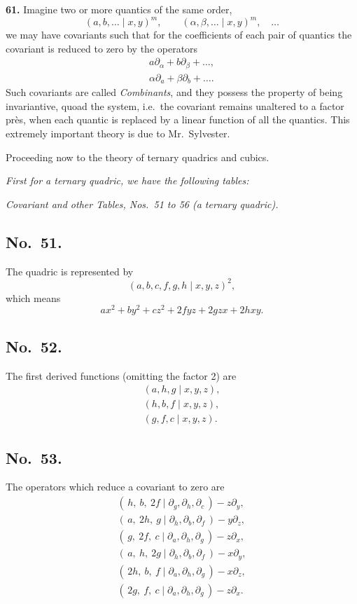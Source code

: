 \documentclass[11pt]{article}
\begin{document}
\medskip

\noindent\textbf{61.} Imagine two or more quantics of the same order,
\[
(a, b, \ldots \mid x, y)^m,\qquad (\alpha, \beta, \ldots \mid x, y)^m, \quad \ldots
\]
we may have covariants such that for the coefficients of each pair of quantics the covariant is reduced to zero by the operators
\begin{align*}
a \partial_\alpha + b \partial_\beta + \ldots, \\
\alpha \partial_a + \beta \partial_b + \ldots.
\end{align*}
Such covariants are called \textit{Combinants}, and they possess the property of being invariantive, quoad the system, i.e.\ the covariant remains unaltered to a factor pr\`es, when each quantic is replaced by a linear function of all the quantics. This extremely important theory is due to Mr.\ Sylvester.

\medskip

Proceeding now to the theory of ternary quadrics and cubics.

\bigskip

\noindent\textit{First for a ternary quadric, we have the following tables:}

\medskip

\noindent\textit{Covariant and other Tables, Nos.\ 51 to 56 (a ternary quadric).}

\subsection*{No.\ 51.}
The quadric is represented by
\[
(a, b, c, f, g, h \mid x, y, z)^2,
\]
which means
\[
ax^2 + by^2 + cz^2 + 2fyz + 2gzx + 2hxy.
\]

\subsection*{No.\ 52.}
The first derived functions (omitting the factor 2) are
\begin{align*}
(a, h, g \mid x, y, z), \\
(h, b, f \mid x, y, z), \\
(g, f, c \mid x, y, z).
\end{align*}

\subsection*{No.\ 53.}
The operators which reduce a covariant to zero are
\begin{align*}
(\,h,\ b,\ 2f \mid \partial_g, \partial_h, \partial_c\,) - z\partial_y, \\
(\,a,\ 2h,\ g \mid \partial_h, \partial_b, \partial_f\,) - y\partial_z, \\
(\,g,\ 2f,\ c \mid \partial_a, \partial_h, \partial_g\,) - z\partial_x, \\
(\,a,\ h,\ 2g \mid \partial_h, \partial_b, \partial_f\,) - x\partial_y, \\
(\,2h,\ b,\ f \mid \partial_a, \partial_h, \partial_g\,) - x\partial_z, \\
(\,2g,\ f,\ c \mid \partial_a, \partial_h, \partial_g\,) - z\partial_x.
\end{align*}
\end{document}
